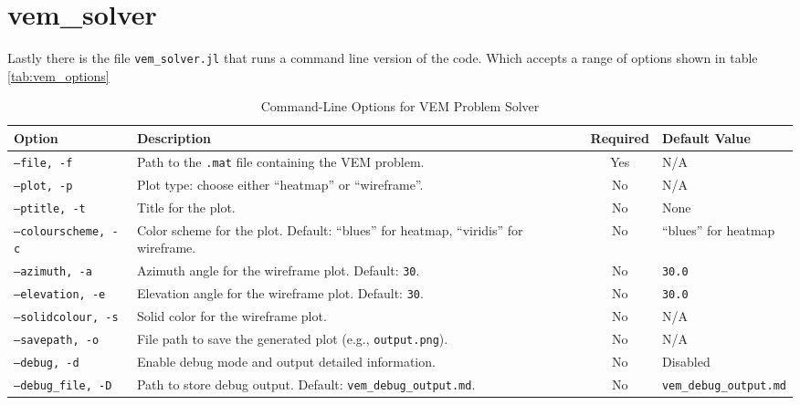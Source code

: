 \documentclass{report}
\begin{document}
\section{vem\_solver}
Lastly there is the file \texttt{vem\_solver.jl} that runs a command line version of the code. Which accepts a range of options shown in table \eqref{tab:vem_options}

\begin{table}[ht]
    \centering
    \caption{Command-Line Options for VEM Problem Solver}
    \label{tab:vem_options}
    \renewcommand{\arraystretch}{1.5}
    \begin{tabularx}{\textwidth}{|l|X|c|X|}
        \hline
        \textbf{Option} & \textbf{Description} & \textbf{Required} & \textbf{Default Value} \\
        \hline
        \texttt{--file, -f}         & Path to the \texttt{.mat} file containing the VEM problem. & Yes & N/A \\
        \texttt{--plot, -p}         & Plot type: choose either ``heatmap'' or ``wireframe''. & No & N/A \\
        \texttt{--ptitle, -t}       & Title for the plot. & No & None \\
        \texttt{--colourscheme, -c} & Color scheme for the plot. Default: ``blues'' for heatmap, ``viridis'' for wireframe. & No & ``blues'' for heatmap \\
        \texttt{--azimuth, -a}      & Azimuth angle for the wireframe plot. Default: \texttt{30}. & No & \texttt{30.0} \\
        \texttt{--elevation, -e}    & Elevation angle for the wireframe plot. Default: \texttt{30}. & No & \texttt{30.0} \\
        \texttt{--solidcolour, -s}  & Solid color for the wireframe plot. & No & N/A \\
        \texttt{--savepath, -o}     & File path to save the generated plot (e.g., \texttt{output.png}). & No & N/A \\
        \texttt{--debug, -d}        & Enable debug mode and output detailed information. & No & Disabled \\
        \texttt{--debug\_file, -D}  & Path to store debug output. Default: \texttt{vem\_debug\_output.md}. & No & \texttt{vem\_debug\_output.md} \\
        \hline
    \end{tabularx}
\end{table}
\end{document}
